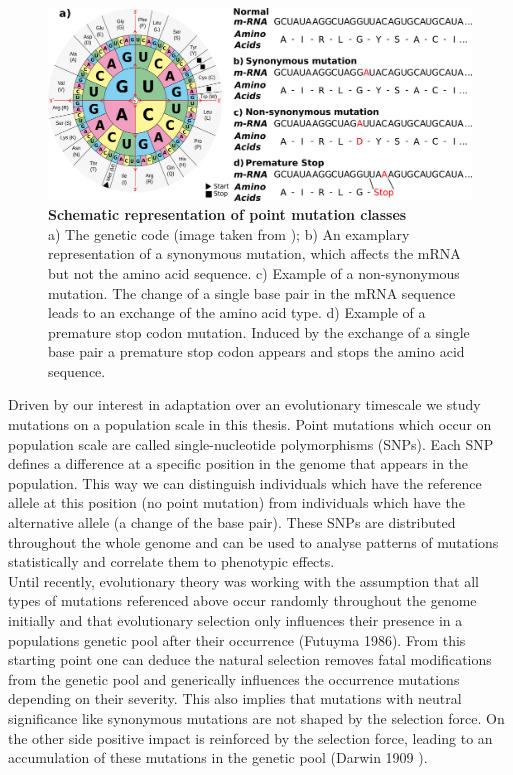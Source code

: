 \begin{figure}[tb]
    \centering
    \begin{minipage}[h]{0.9\textwidth}
      \centering
      \includegraphics[width=1\textwidth]{images/Mutations.png}
      \caption[Schematic representation of point mutation classes]{\textbf{Schematic representation of point mutation classes}\\
      a) The genetic code (image taken from \textcite{bresch2013}); b) An examplary representation of a synonymous mutation, which affects the mRNA but not the amino acid sequence. c) Example of a non-synonymous mutation. The change of a single base pair in the mRNA sequence leads to an exchange of the amino acid type. d) Example of a premature stop codon mutation. Induced by the exchange of a single base pair a premature stop codon appears and stops the amino acid sequence.}
     \label{fig:Codons}
    \end{minipage}
  \end{figure}
Driven by our interest in adaptation over an evolutionary timescale we study mutations on a population scale in this thesis. Point mutations which occur on population scale are called single-nucleotide polymorphisms (SNPs). Each SNP defines a difference at a  specific position in the genome that appears in the population. This way we can distinguish individuals which have the reference allele at this position (no point mutation) from individuals which have the alternative allele (a change of the base pair). These SNPs are distributed throughout the whole genome and can be used to analyse patterns of mutations statistically and correlate them to phenotypic effects. \\
Until recently, evolutionary theory was working with the assumption that all types of mutations referenced above occur randomly throughout the genome initially and that evolutionary selection only influences their presence in a populations genetic pool after their occurrence (Futuyma 1986\cite{futuyma1986}). From this starting point one can deduce the natural selection removes fatal modifications from the genetic pool and generically influences the occurrence mutations depending on their severity. This also implies that mutations with neutral significance like synonymous mutations are not shaped by the selection force. On the other side positive impact is reinforced by the selection force, leading to an accumulation of these mutations in the genetic pool (Darwin 1909 \cite{darwin1909}).\\
